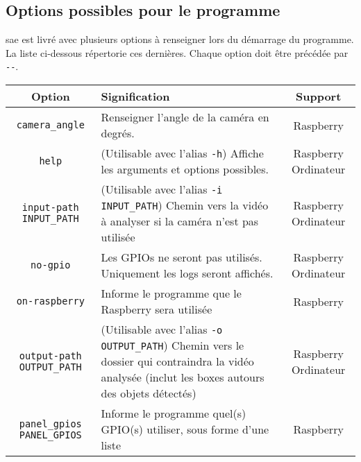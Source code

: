 \subsection{Options possibles pour le programme}
\label{sec:executionOption_clearWay}
\gls{sae} est livré avec plusieurs options à renseigner lors du démarrage du programme. La liste ci-dessous répertorie ces dernières.
Chaque option doit être précédée par \verb=--=.
\begin{table}[H]
    \centering
    \begin{tabularx}{\linewidth}{|c|X|c|}
        \hline
        \rowcolor{tableColorDark} Option & Signification & Support   \\
        \hline
        \verb=camera_angle=                          & Renseigner l'angle de la caméra en degrés.                                                                                                                        & Raspberry               \\\hline
        \verb=help=                                  & (Utilisable avec l'alias \verb=-h=) Affiche les arguments et options possibles.                                                                                   & Raspberry Ordinateur    \\\hline
        \verb=input-path INPUT_PATH=                 & (Utilisable avec l'alias \verb=-i INPUT_PATH=) Chemin vers la vidéo à analyser si la caméra n'est pas utilisée                                                    & Raspberry Ordinateur    \\\hline
        \verb=no-gpio=                               & Les GPIOs ne seront pas utilisés. Uniquement les logs seront affichés.                                                                                            & Raspberry Ordinateur    \\\hline
        \verb=on-raspberry=                          & Informe le programme que le Raspberry sera utilisée                                                                                                               & Raspberry               \\\hline
        \verb=output-path OUTPUT_PATH=               & (Utilisable avec l'alias \verb=-o OUTPUT_PATH=) Chemin vers le dossier qui contraindra la vidéo analysée (inclut les boxes autours des objets détectés)           & Raspberry Ordinateur    \\\hline
        \verb=panel_gpios PANEL_GPIOS=               & Informe le programme quel(s) GPIO(s) utiliser, sous forme d'une liste                                                                                             & Raspberry               \\\hline

\end{tabularx}
\end{table}
